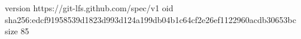 version https://git-lfs.github.com/spec/v1
oid sha256:edcf91958539d1823d993d124a199db04b1c64cf2e26ef1122960acdb30653bc
size 85
